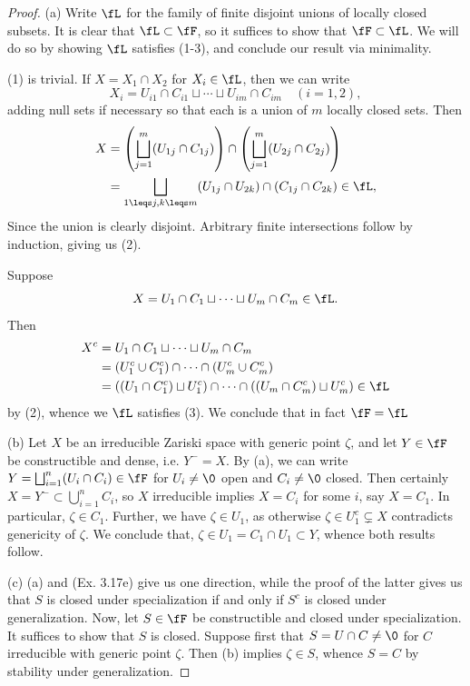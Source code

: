 \documentclass[12pt]{amsart}
\begin{document}
\begin{proof}
  (a) Write $\fL$ for the family of finite disjoint unions of locally closed subsets. 
  It is clear that $\fL\subset \fF$, so it suffices to show that $\fF\subset \fL$.
  We will do so by showing $\fL$ satisfies (1-3), and conclude our result via minimality.

  (1) is trivial.
  If $X=X_1\cap X_2$ for $X_i\in \fL$, then we can write
  \[
    X_i= U_{i1}\cap C_{i1}\sqcup\cdots\sqcup U_{im}\cap C_{im}\quad (i=1,2),
  \]
  adding null sets if necessary so that each is a union of $m$ locally closed sets.
  Then
  \begin{align*}
    X
      &= \left(\bigsqcup_{j=1}^m (U_{1j}\cap C_{1j})\right)\cap \left(\bigsqcup_{j=1}^m (U_{2j}\cap C_{2j})\right) \\
      &= \bigsqcup_{1\leqs j,k\leqs m}(U_{1j}\cap U_{2k})\cap (C_{1j}\cap C_{2k})\in \fL,
  \end{align*}
  Since the union is clearly disjoint.
  Arbitrary finite intersections follow by induction, giving us (2).

  Suppose 
  \[
    X= U_1\cap C_1\sqcup\cdots\sqcup U_m\cap C_m\in \fL.
  \]
  Then
  \begin{align*}
    X^c &= U_1\cap C_1\sqcup\cdots\sqcup U_m\cap C_m \\
        &= (U_1^c\cup C_1^c) \cap\cdots \cap (U_m^c\cup C_m^c) \\
        &= ((U_1\cap C_1^c)\sqcup U_1^c)\cap\cdots \cap((U_m\cap C_m^c)\sqcup U_m^c) \in \fL
  \end{align*}
  by (2), whence we $\fL$ satisfies (3).
  We conclude that in fact $\fF=\fL$

  (b) Let $X$ be an irreducible Zariski space with generic point $\zeta$, and let $Y\in \fF$ be constructible and dense, i.e. $Y^-=X$.
  By (a), we can write $Y=\bigsqcup_{i=1}^n(U_i\cap C_i)\in \fF$ for $U_i\neq \0$ open and $C_i\neq \0$ closed.
  Then certainly $X=Y^-\subset \bigcup_{i=1}^n C_i$, so $X$ irreducible implies $X= C_i$ for some $i$, say $X= C_1$.
  In particular, $\zeta\in C_1$.
  Further, we have $\zeta\in U_1$, as otherwise $\zeta\in U_1^c\subsetneq X$ contradicts genericity of $\zeta$.
  We conclude that, $\zeta\in U_1=C_1\cap U_1\subset Y$, whence both results follow.

  (c) (a) and (Ex. 3.17e) give us one direction, while the proof of the latter gives us that $S$ is closed under specialization if and only if $S^c$ is closed under generalization.
  Now, let $S\in \fF$ be constructible and closed under specialization.
  It suffices to show that $S$ is closed.
  Suppose first that $S=U\cap C\neq \0$ for $C$ irreducible with generic point $\zeta$.
  Then (b) implies $\zeta\in S$, whence $S=C$ by stability under generalization.


\end{proof}
\end{document}
